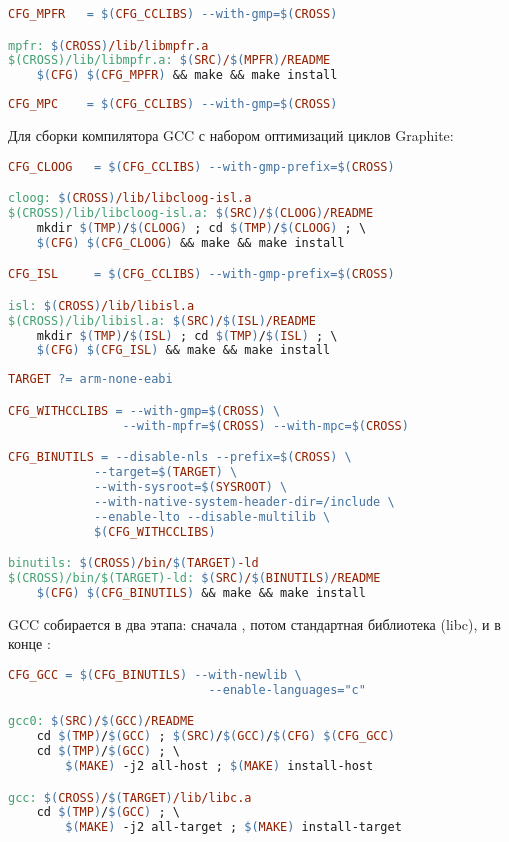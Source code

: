 \begin{lstlisting}[language=make]
CFG_MPFR   = $(CFG_CCLIBS) --with-gmp=$(CROSS)

mpfr: $(CROSS)/lib/libmpfr.a
$(CROSS)/lib/libmpfr.a: $(SRC)/$(MPFR)/README
	$(CFG) $(CFG_MPFR) && make && make install
\end{lstlisting}

\begin{lstlisting}[language=make]
CFG_MPC    = $(CFG_CCLIBS) --with-gmp=$(CROSS)
\end{lstlisting}

Для сборки компилятора GCC с набором оптимизаций циклов Graphite:

\begin{lstlisting}[language=make]
CFG_CLOOG	= $(CFG_CCLIBS) --with-gmp-prefix=$(CROSS)

cloog: $(CROSS)/lib/libcloog-isl.a
$(CROSS)/lib/libcloog-isl.a: $(SRC)/$(CLOOG)/README
	mkdir $(TMP)/$(CLOOG) ; cd $(TMP)/$(CLOOG) ; \ 
	$(CFG) $(CFG_CLOOG) && make && make install

CFG_ISL		= $(CFG_CCLIBS) --with-gmp-prefix=$(CROSS)

isl: $(CROSS)/lib/libisl.a
$(CROSS)/lib/libisl.a: $(SRC)/$(ISL)/README
	mkdir $(TMP)/$(ISL) ; cd $(TMP)/$(ISL) ; \ 
	$(CFG) $(CFG_ISL) && make && make install
\end{lstlisting}

\clearpage
\begin{lstlisting}[language=make]
TARGET ?= arm-none-eabi

CFG_WITHCCLIBS = --with-gmp=$(CROSS) \
				--with-mpfr=$(CROSS) --with-mpc=$(CROSS)

CFG_BINUTILS = --disable-nls --prefix=$(CROSS) \
			--target=$(TARGET) \
			--with-sysroot=$(SYSROOT) \
			--with-native-system-header-dir=/include \
			--enable-lto --disable-multilib \
			$(CFG_WITHCCLIBS)

binutils: $(CROSS)/bin/$(TARGET)-ld
$(CROSS)/bin/$(TARGET)-ld: $(SRC)/$(BINUTILS)/README
	$(CFG) $(CFG_BINUTILS) && make && make install
\end{lstlisting}

GCC собирается в два этапа: сначала , потом стандартная библиотека
\file{newlib} (libc), и в конце :

\begin{lstlisting}[language=make]
CFG_GCC = $(CFG_BINUTILS) --with-newlib \
							--enable-languages="c"

gcc0: $(SRC)/$(GCC)/README
	cd $(TMP)/$(GCC) ; $(SRC)/$(GCC)/$(CFG) $(CFG_GCC)
	cd $(TMP)/$(GCC) ; \
		$(MAKE) -j2 all-host ; $(MAKE) install-host

gcc: $(CROSS)/$(TARGET)/lib/libc.a
	cd $(TMP)/$(GCC) ; \
		$(MAKE) -j2 all-target ; $(MAKE) install-target
\end{lstlisting}

